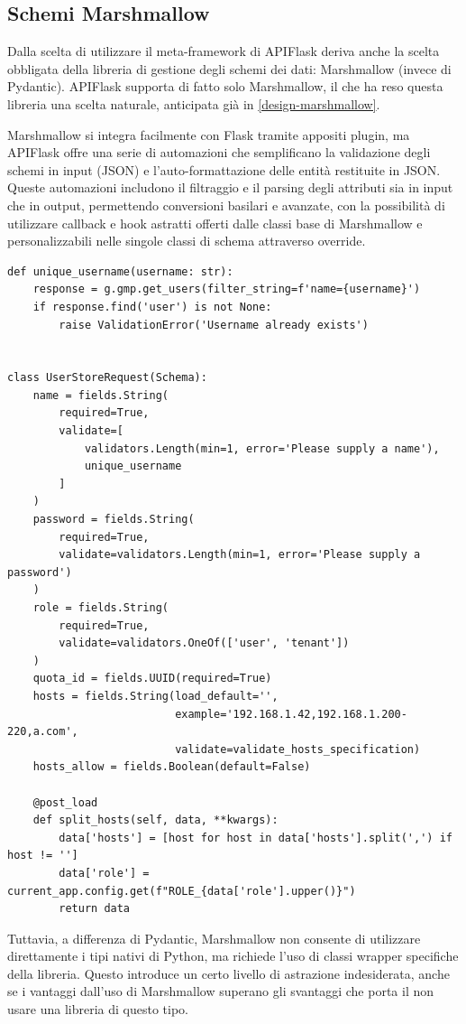 \subsection{Schemi Marshmallow}
Dalla scelta di utilizzare il meta-framework di APIFlask deriva anche la scelta obbligata della libreria di gestione degli schemi dei dati: Marshmallow (invece di Pydantic). APIFlask supporta di fatto solo Marshmallow, il che ha reso questa libreria una scelta naturale, anticipata già in \ref{design-marshmallow}.

Marshmallow si integra facilmente con Flask tramite appositi plugin, ma APIFlask offre una serie di automazioni che semplificano la validazione degli schemi in input (JSON) e l'auto-formattazione delle entità restituite in JSON. Queste automazioni includono il filtraggio e il parsing degli attributi sia in input che in output, permettendo conversioni basilari e avanzate, con la possibilità di utilizzare callback e hook astratti offerti dalle classi base di Marshmallow e personalizzabili nelle singole classi di schema attraverso override.

\begin{verbatim}
def unique_username(username: str):
    response = g.gmp.get_users(filter_string=f'name={username}')
    if response.find('user') is not None:
        raise ValidationError('Username already exists')


class UserStoreRequest(Schema):
    name = fields.String(
        required=True,
        validate=[
            validators.Length(min=1, error='Please supply a name'),
            unique_username
        ]
    )
    password = fields.String(
        required=True,
        validate=validators.Length(min=1, error='Please supply a password')
    )
    role = fields.String(
        required=True,
        validate=validators.OneOf(['user', 'tenant'])
    )
    quota_id = fields.UUID(required=True)
    hosts = fields.String(load_default='',
                          example='192.168.1.42,192.168.1.200-220,a.com',
                          validate=validate_hosts_specification)
    hosts_allow = fields.Boolean(default=False)

    @post_load
    def split_hosts(self, data, **kwargs):
        data['hosts'] = [host for host in data['hosts'].split(',') if host != '']
        data['role'] = current_app.config.get(f"ROLE_{data['role'].upper()}")
        return data
\end{verbatim}

Tuttavia, a differenza di Pydantic, Marshmallow non consente di utilizzare direttamente i tipi nativi di Python, ma richiede l'uso di classi wrapper specifiche della libreria. Questo introduce un certo livello di astrazione indesiderata, anche se i vantaggi dall'uso di Marshmallow superano gli svantaggi che porta il non usare una libreria di questo tipo.

